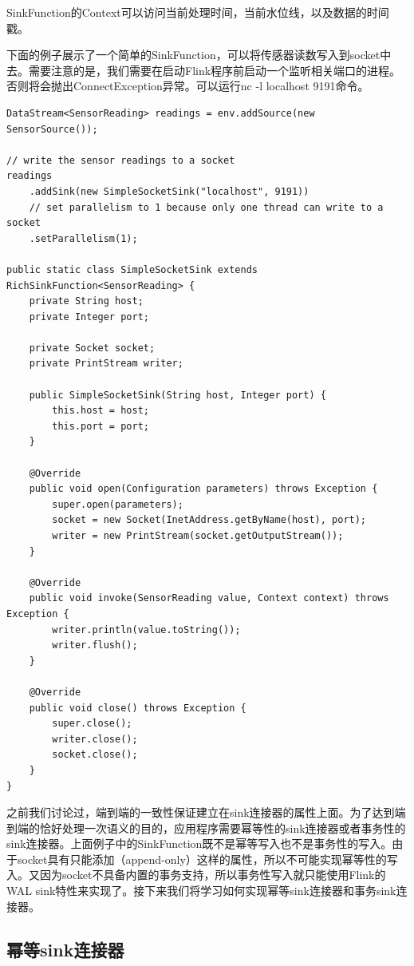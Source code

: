 \documentclass[cn,11pt,chinese]{elegantbook}
\begin{document}
SinkFunction的Context可以访问当前处理时间，当前水位线，以及数据的时间戳。

下面的例子展示了一个简单的SinkFunction，可以将传感器读数写入到socket中去。需要注意的是，我们需要在启动Flink程序前启动一个监听相关端口的进程。否则将会抛出ConnectException异常。可以运行nc -l localhost 9191命令。


\begin{verbatim}
DataStream<SensorReading> readings = env.addSource(new SensorSource());

// write the sensor readings to a socket
readings
    .addSink(new SimpleSocketSink("localhost", 9191))
    // set parallelism to 1 because only one thread can write to a socket
    .setParallelism(1);

public static class SimpleSocketSink extends RichSinkFunction<SensorReading> {
    private String host;
    private Integer port;

    private Socket socket;
    private PrintStream writer;

    public SimpleSocketSink(String host, Integer port) {
        this.host = host;
        this.port = port;
    }

    @Override
    public void open(Configuration parameters) throws Exception {
        super.open(parameters);
        socket = new Socket(InetAddress.getByName(host), port);
        writer = new PrintStream(socket.getOutputStream());
    }

    @Override
    public void invoke(SensorReading value, Context context) throws Exception {
        writer.println(value.toString());
        writer.flush();
    }

    @Override
    public void close() throws Exception {
        super.close();
        writer.close();
        socket.close();
    }
}
\end{verbatim}

之前我们讨论过，端到端的一致性保证建立在sink连接器的属性上面。为了达到端到端的恰好处理一次语义的目的，应用程序需要幂等性的sink连接器或者事务性的sink连接器。上面例子中的SinkFunction既不是幂等写入也不是事务性的写入。由于socket具有只能添加（append-only）这样的属性，所以不可能实现幂等性的写入。又因为socket不具备内置的事务支持，所以事务性写入就只能使用Flink的WAL sink特性来实现了。接下来我们将学习如何实现幂等sink连接器和事务sink连接器。

\subsection{幂等sink连接器}
\end{document}
